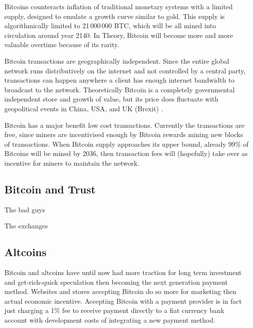 \documentclass[12pt]{article} %
\begin{document}
Bitcoins counteracts inflation of traditional monetary systems with a limited supply, designed to emulate a growth curve similar to gold. This supply is algorithmically limited to 21\,000\,000 BTC, which will be all mined into circulation around year 2140. In Theory, Bitcoin will become more and more valuable overtime because of its rarity.

Bitcoin transactions are geographically independent. Since the entire global network runs distributively on the internet and not controlled by a central party, transactions can happen anywhere a client has enough internet bandwidth to broadcast to the network. Theoretically  Bitcoin is a completely governmental independent store and growth of value, but its price does fluctuate with geopolitical events in China, USA, and UK (Brexit) .

Bitcoin has a major benefit low cost transactions. Currently the transactions are free, since miners are incentivised enough by Bitcoin rewards mining new blocks of transactions. When Bitcoin supply approaches its upper bound, already 99\% of Bitcoins will be mined by 2036, then transaction fees will (hopefully) take over as incentive for miners to maintain the network.   

\subsection{Bitcoin and Trust}
The bad guys

The exchanges



\subsection{Altcoins}
Bitcoin and altcoins have until now had more traction for long term investment and get-rich-quick speculation then becoming the next generation payment method. Websites and stores accepting Bitcoin do so more for marketing then actual economic incentive. Accepting Bitcoin with a payment provider is in fact just charging a 1\% fee to receive payment directly to a fiat currency bank account with development costs of integrating a new payment method.
\end{document}
